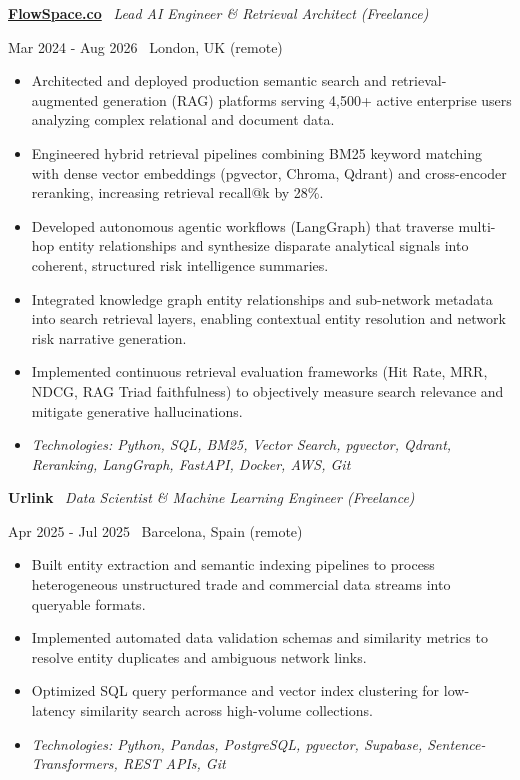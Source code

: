\documentclass[a4paper,10pt]{article}
\newcommand{\role}[4]{%
  \vspace{2pt}\noindent
  \begin{minipage}[t]{0.70\textwidth}\raggedright\textbf{#1} \textbullet\ \textit{#3}\end{minipage}%
  \hfill
  \begin{minipage}[t]{0.28\textwidth}\raggedleft\footnotesize\color{gray}#2 \textbullet\ #4\end{minipage}%
  \vspace{1pt}%
}
\begin{document}
\role{\href{https://flowspace.co}{FlowSpace.co}}{Mar 2024 - Aug 2026}{Lead AI Engineer \& Retrieval Architect (Freelance)}{London, UK (remote)}
\begin{itemize}
  \item Architected and deployed production semantic search and retrieval-augmented generation (RAG) platforms serving 4,500+ active enterprise users analyzing complex relational and document data.
  \item Engineered hybrid retrieval pipelines combining BM25 keyword matching with dense vector embeddings (pgvector, Chroma, Qdrant) and cross-encoder reranking, increasing retrieval recall@k by 28\%.
  \item Developed autonomous agentic workflows (LangGraph) that traverse multi-hop entity relationships and synthesize disparate analytical signals into coherent, structured risk intelligence summaries.
  \item Integrated knowledge graph entity relationships and sub-network metadata into search retrieval layers, enabling contextual entity resolution and network risk narrative generation.
  \item Implemented continuous retrieval evaluation frameworks (Hit Rate, MRR, NDCG, RAG Triad faithfulness) to objectively measure search relevance and mitigate generative hallucinations.
  \item \textit{Technologies: Python, SQL, BM25, Vector Search, pgvector, Qdrant, Reranking, LangGraph, FastAPI, Docker, AWS, Git}
\end{itemize}

\role{Urlink}{Apr 2025 - Jul 2025}{Data Scientist \& Machine Learning Engineer (Freelance)}{Barcelona, Spain (remote)}
\begin{itemize}
  \item Built entity extraction and semantic indexing pipelines to process heterogeneous unstructured trade and commercial data streams into queryable formats.
  \item Implemented automated data validation schemas and similarity metrics to resolve entity duplicates and ambiguous network links.
  \item Optimized SQL query performance and vector index clustering for low-latency similarity search across high-volume collections.
  \item \textit{Technologies: Python, Pandas, PostgreSQL, pgvector, Supabase, Sentence-Transformers, REST APIs, Git}
\end{itemize}
\end{document}
